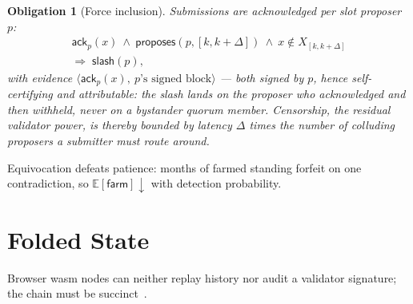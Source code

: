 \documentclass[11pt,letterpaper]{article}
\newtheorem{obligation}{Obligation}
\begin{document}
\begin{obligation}[Force inclusion]\label{obl:inclusion}
Submissions are acknowledged per slot proposer $p$:
\[
\begin{array}{r}
\mathsf{ack}_p(x)\ \land\
\mathsf{proposes}(p,[k,k+\Delta])\ \land\
x\notin X_{[k,k+\Delta]}\\
\Rightarrow\;
\mathsf{slash}(p),
\end{array}
\]
with evidence $\langle\mathsf{ack}_p(x),\ \text{$p$'s signed
block}\rangle$ --- both signed by $p$, hence self-certifying \emph{and}
attributable: the slash lands on the proposer who acknowledged and then
withheld, never on a bystander quorum member.  Censorship, the residual
validator power, is thereby bounded by latency $\Delta$ times the
number of colluding proposers a submitter must route around.
\end{obligation}

Equivocation defeats patience: months of farmed standing forfeit on one
contradiction, so
$\mathbb{E}[\mathsf{farm}]\downarrow$ with detection probability.

\section{Folded State}\label{sec:ivc}

Browser wasm nodes can neither replay history nor audit a validator
signature; the chain must be succinct~\cite{Mina}.
\end{document}
